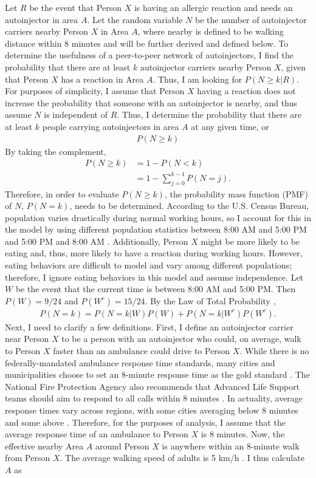 Let $R$ be the event that Person $X$ is having an allergic reaction and needs an autoinjector in area $A$. Let the random variable $N$ be the number of autoinjector carriers nearby Person $X$ in Area $A$, where nearby is defined to be walking distance within 8 minutes and will be further derived and defined below. To determine the usefulness of a peer-to-peer network of autoinjectors, I find the probability that there are at least $k$ autoinjector carriers nearby Person $X$, given that Person $X$ has a reaction in Area $A$. Thus, I am looking for $P(N \geq k|R)$. For purposes of simplicity, I assume that Person $X$ having a reaction does not increase the probability that someone with an autoinjector is nearby, and thus assume $N$ is independent of $R$. Thus, I determine the probability that there are at least $k$ people carrying autoinjectors in area $A$ at any given time, or
\begin{align*}
    P(N \geq k)
\end{align*}
By taking the complement,
\begin{align*}
    P(N \geq k) &= 1 - P(N < k) \\
    &= 1 - \sum_{j=0}^{k-1}P(N=j).
\end{align*}
Therefore, in order to evaluate $P(N \geq k)$, the probability mass function (PMF) of $N$, $P(N=k)$, needs to be determined. According to the U.S. Census Bureau, population varies drastically during normal working hours, so I account for this in the model by using different population statistics between 8:00 AM and 5:00 PM and 5:00 PM and 8:00 AM \cite{acs}. Additionally, Person $X$ might be more likely to be eating and, thus, more likely to have a reaction during working hours. However, eating behaviors are difficult to model and vary among different populations; therefore, I ignore eating behaviors in this model and assume independence. Let $W$ be the event that the current time is between 8:00 AM and 5:00 PM. Then $P(W) = 9/24$ and $P(W^c) = 15/24$. By the Law of Total Probability \cite{blitz},
\begin{align*}
    P(N=k) = P(N=k|W)P(W)+ P(N=k|W^c)P(W^c).
\end{align*}
Next, I need to clarify a few definitions. First, I define an autoinjector carrier near Person $X$ to be a person with an autoinjector who could, on average, walk to Person $X$ faster than an ambulance could drive to Person $X$. While there is no federally-mandated ambulance response time standards, many cities and municipalities choose to set an 8-minute response time as the gold standard \cite{ems}. The National Fire Protection Agency also recommends that Advanced Life Support teams should aim to respond to all calls within 8 minutes \cite{nfpa}. In actuality, average response times vary across regions, with some cities averaging below 8 minutes and some above \cite{nycems}\cite{bostonems}.  Therefore, for the purposes of analysis, I assume that the average response time of an ambulance to Person $X$ is 8 minutes. Now, the effective nearby Area $A$ around Person $X$ is anywhere within an 8-minute walk from Person $X$. The average walking speed of adults is 5 km/h \cite{walking}. I thus calculate $A$ as
